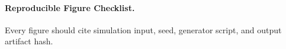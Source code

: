 \paragraph{Reproducible Figure Checklist.} Every figure should cite simulation input, seed, generator script, and output artifact hash.\n